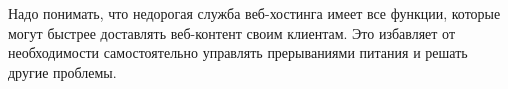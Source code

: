 Надо понимать, что недорогая служба веб-хостинга имеет все функции, которые могут быстрее доставлять веб-контент своим клиентам. Это избавляет от необходимости самостоятельно управлять прерываниями питания и решать другие проблемы.


%
